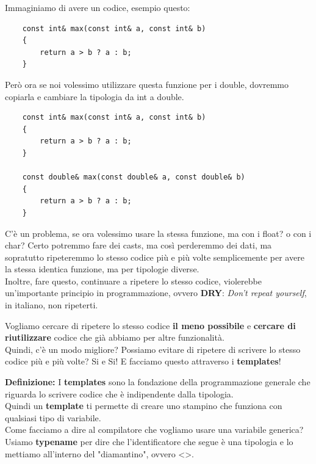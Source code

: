 \textsf{\small Immaginiamo di avere un codice, esempio questo:} \\

\begin{lstlisting}
	const int& max(const int& a, const int& b)
	{
		return a > b ? a : b;
	}
\end{lstlisting}

\textsf{\small Però ora se noi volessimo utilizzare questa funzione per i double, dovremmo copiarla e cambiare la tipologia da int a double.} \\

\begin{lstlisting}
	const int& max(const int& a, const int& b)
	{
		return a > b ? a : b;
	}

	const double& max(const double& a, const double& b)
	{
		return a > b ? a : b;
	}
\end{lstlisting}

\textsf{\small C'è un problema, se ora volessimo usare la stessa funzione, ma con i float? o con i char? Certo potremmo fare dei casts, ma così perderemmo dei dati, ma sopratutto ripeteremmo lo stesso codice più e più volte semplicemente per avere la stessa identica funzione, ma per tipologie diverse.} \\

\textsf{\small Inoltre, fare questo, continuare a ripetere lo stesso codice, violerebbe un'importante principio in programmazione, ovvero \textbf{DRY}: \emph{Don't repeat yourself}, in italiano, non ripeterti.} \break 

\textsf{\small Vogliamo cercare di ripetere lo stesso codice \textbf{il meno possibile} e \textbf{cercare di riutilizzare} codice che già abbiamo per altre funzionalità.} \\

\textsf{\small Quindi, c'è un modo migliore? Possiamo evitare di ripetere di scrivere lo stesso codice più e più volte? Si e Si! E facciamo questo attraverso i \textbf{templates}!} \break

\textsf{\small \textbf{Definizione:} I \textbf{templates} sono la fondazione della programmazione generale che riguarda lo scrivere codice che è indipendente dalla tipologia. } \\

\textsf{\small Quindi un \textbf{template} ti permette di creare uno stampino che funziona con qualsiasi tipo di variabile.} \\

\textsf{\small Come facciamo a dire al compilatore che vogliamo usare una variabile generica? Usiamo \textbf{typename} per dire che l'identificatore che segue è una tipologia e lo mettiamo all'interno del "diamantino", ovvero <>.} \\

